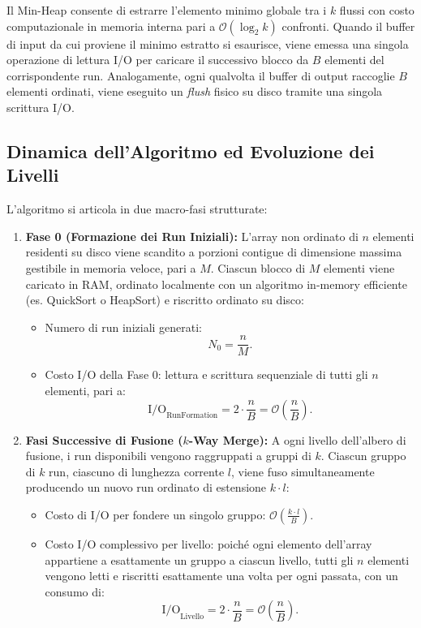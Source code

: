 Il Min-Heap consente di estrarre l'elemento minimo globale tra i $k$ flussi con costo computazionale in memoria interna pari a $\mathcal{O}(\log_2 k)$ confronti. Quando il buffer di input da cui proviene il minimo estratto si esaurisce, viene emessa una singola operazione di lettura I/O per caricare il successivo blocco da $B$ elementi del corrispondente run. Analogamente, ogni qualvolta il buffer di output raccoglie $B$ elementi ordinati, viene eseguito un \textit{flush} fisico su disco tramite una singola scrittura I/O.

\FloatBarrier
\subsection{Dinamica dell'Algoritmo ed Evoluzione dei Livelli}
\label{subsec:multiway-dynamics}

L'algoritmo si articola in due macro-fasi strutturate:

\begin{enumerate}
  \item \textbf{Fase 0 (Formazione dei Run Iniziali):}
  L'array non ordinato di $n$ elementi residenti su disco viene scandito a porzioni contigue di dimensione massima gestibile in memoria veloce, pari a $M$. Ciascun blocco di $M$ elementi viene caricato in RAM, ordinato localmente con un algoritmo in-memory efficiente (es. QuickSort o HeapSort) e riscritto ordinato su disco:
  \begin{itemize}
    \item Numero di run iniziali generati:
    \begin{equation}
      N_0 = \frac{n}{M}.
    \end{equation}
    \item Costo I/O della Fase 0: lettura e scrittura sequenziale di tutti gli $n$ elementi, pari a:
    \begin{equation}
      \mathrm{I/O}_{\text{RunFormation}} = 2 \cdot \frac{n}{B} = \mathcal{O}\left(\frac{n}{B}\right).
    \end{equation}
  \end{itemize}

  \item \textbf{Fasi Successive di Fusione ($k$-Way Merge):}
  A ogni livello dell'albero di fusione, i run disponibili vengono raggruppati a gruppi di $k$. Ciascun gruppo di $k$ run, ciascuno di lunghezza corrente $l$, viene fuso simultaneamente producendo un nuovo run ordinato di estensione $k \cdot l$:
  \begin{itemize}
    \item Costo di I/O per fondere un singolo gruppo: $\mathcal{O}\left(\frac{k \cdot l}{B}\right)$.
    \item Costo I/O complessivo per livello: poiché ogni elemento dell'array appartiene a esattamente un gruppo a ciascun livello, tutti gli $n$ elementi vengono letti e riscritti esattamente una volta per ogni passata, con un consumo di:
    \begin{equation}
      \mathrm{I/O}_{\text{Livello}} = 2 \cdot \frac{n}{B} = \mathcal{O}\left(\frac{n}{B}\right).
    \end{equation}
  \end{itemize}
\end{enumerate}

